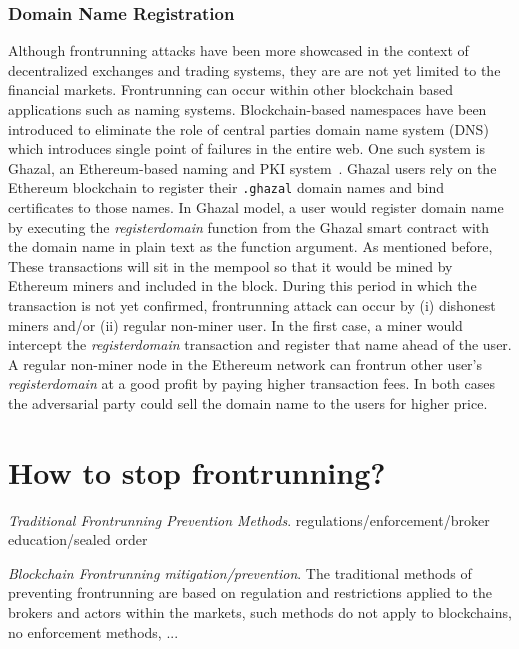 \subsubsection{Domain Name Registration} 
%
Although frontrunning attacks have been more showcased in the context of decentralized exchanges and trading systems, they are are not yet limited to the financial markets. Frontrunning can occur within other blockchain based applications such as naming systems. Blockchain-based namespaces have been introduced to eliminate the role of central parties \ie domain name system (DNS) which introduces single point of failures in the entire web. One such system is Ghazal, an Ethereum-based naming and PKI system~\cite{moosavighazal}. Ghazal users rely on the Ethereum blockchain to register their \texttt{.ghazal} domain names and bind certificates to those names. In Ghazal model, a user would register domain name by executing the \textit{registerdomain} function from the Ghazal smart contract with the domain name in plain text as the function argument. As mentioned before, These transactions will sit in the mempool so that it would be mined by Ethereum miners and included in the block. During this period in which the transaction is not yet confirmed, frontrunning attack can occur by (i) dishonest miners and/or (ii) regular non-miner user. In the first case, a miner would intercept the \textit{registerdomain} transaction and register that name ahead of the user. A regular non-miner node in the Ethereum network can frontrun other user's \textit{registerdomain} at a good profit by paying higher transaction fees. In both cases the adversarial party could sell the domain name to the users for higher price.








\section{How to stop frontrunning?}

\emph{Traditional Frontrunning Prevention Methods}. regulations/enforcement/broker education/sealed order


\emph{Blockchain Frontrunning mitigation/prevention}. The traditional methods of preventing frontrunning are based on regulation and restrictions applied to the brokers and actors within the markets, such methods do not apply to blockchains, no enforcement methods, ... 

